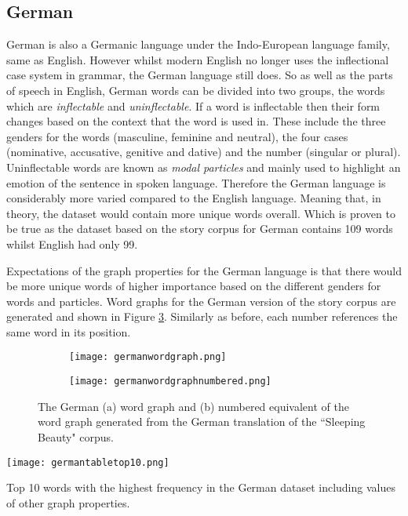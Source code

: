 \subsection{German}
German is also a Germanic language under the Indo-European language family, same as English. However whilst modern English no longer uses the inflectional case system in grammar, the German language still does\cite{durrell2011hammer}. So as well as the parts of speech in English, German words can be divided into two groups, the words which are \emph{inflectable} and \emph{uninflectable}. If a word is inflectable then their form changes based on the context that the word is used in. These include the three genders for the words (masculine, feminine and neutral), the four cases (nominative, accusative, genitive and dative) and the number (singular or plural). Uninflectable words are known as \emph{modal particles} and mainly used to highlight an emotion of the sentence in spoken language. Therefore the German language is considerably more varied compared to the English language. Meaning that, in theory, the dataset would contain more unique words overall. Which is proven to be true as the dataset based on the story corpus for German contains 109 words whilst English had only 99.

Expectations of the graph properties for the German language is that there would be more unique words of higher importance based on the different genders for words and particles. Word graphs for the German version of the story corpus are generated and shown in Figure \ref{fig:gergraph}. Similarly as before, each number references the same word in its position.

\begin{figure}[H]
\centering
\begin{subfigure}{.45\textwidth}
	\texttt{[image: germanwordgraph.png]}
	\caption{}
	\label{fig:gerword}
\end{subfigure}
\hfill
\begin{subfigure}{.45\textwidth}
	\hspace{-2cm} 
	\texttt{[image: germanwordgraphnumbered.png]}
	\caption{}
	\label{fig:gernum}
\end{subfigure}
\caption{The German (a) word graph and (b) numbered equivalent of the word graph generated from the German translation of the ``Sleeping Beauty" corpus.}
\label{fig:gergraph}
\end{figure}

\begin{table}[H]
\centering
\texttt{[image: germantabletop10.png]}
\caption{Top 10 words with the highest frequency in the German dataset including values of other graph properties. }
\label{table:germantop}
\end{table}

